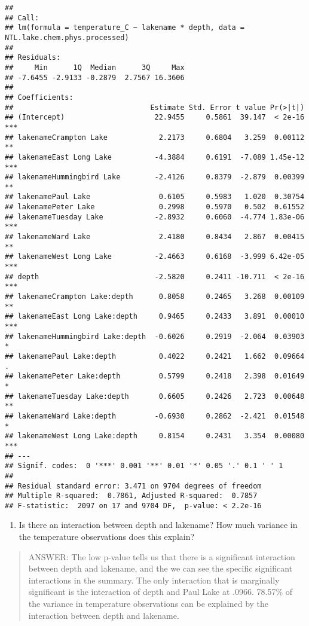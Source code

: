 \documentclass[]{article}
\providecommand{\tightlist}{%
  \setlength{\itemsep}{0pt}\setlength{\parskip}{0pt}}
\begin{document}
\begin{verbatim}
## 
## Call:
## lm(formula = temperature_C ~ lakename * depth, data = NTL.lake.chem.phys.processed)
## 
## Residuals:
##     Min      1Q  Median      3Q     Max 
## -7.6455 -2.9133 -0.2879  2.7567 16.3606 
## 
## Coefficients:
##                                Estimate Std. Error t value Pr(>|t|)    
## (Intercept)                     22.9455     0.5861  39.147  < 2e-16 ***
## lakenameCrampton Lake            2.2173     0.6804   3.259  0.00112 ** 
## lakenameEast Long Lake          -4.3884     0.6191  -7.089 1.45e-12 ***
## lakenameHummingbird Lake        -2.4126     0.8379  -2.879  0.00399 ** 
## lakenamePaul Lake                0.6105     0.5983   1.020  0.30754    
## lakenamePeter Lake               0.2998     0.5970   0.502  0.61552    
## lakenameTuesday Lake            -2.8932     0.6060  -4.774 1.83e-06 ***
## lakenameWard Lake                2.4180     0.8434   2.867  0.00415 ** 
## lakenameWest Long Lake          -2.4663     0.6168  -3.999 6.42e-05 ***
## depth                           -2.5820     0.2411 -10.711  < 2e-16 ***
## lakenameCrampton Lake:depth      0.8058     0.2465   3.268  0.00109 ** 
## lakenameEast Long Lake:depth     0.9465     0.2433   3.891  0.00010 ***
## lakenameHummingbird Lake:depth  -0.6026     0.2919  -2.064  0.03903 *  
## lakenamePaul Lake:depth          0.4022     0.2421   1.662  0.09664 .  
## lakenamePeter Lake:depth         0.5799     0.2418   2.398  0.01649 *  
## lakenameTuesday Lake:depth       0.6605     0.2426   2.723  0.00648 ** 
## lakenameWard Lake:depth         -0.6930     0.2862  -2.421  0.01548 *  
## lakenameWest Long Lake:depth     0.8154     0.2431   3.354  0.00080 ***
## ---
## Signif. codes:  0 '***' 0.001 '**' 0.01 '*' 0.05 '.' 0.1 ' ' 1
## 
## Residual standard error: 3.471 on 9704 degrees of freedom
## Multiple R-squared:  0.7861, Adjusted R-squared:  0.7857 
## F-statistic:  2097 on 17 and 9704 DF,  p-value: < 2.2e-16
\end{verbatim}

\begin{enumerate}
\def\labelenumi{\arabic{enumi}.}
\setcounter{enumi}{14}
\tightlist
\item
  Is there an interaction between depth and lakename? How much variance
  in the temperature observations does this explain?
\end{enumerate}

\begin{quote}
ANSWER: The low p-value tells us that there is a significant interaction
between depth and lakename, and the we can see the specific significant
interactions in the summary. The only interaction that is marginally
significant is the interaction of depth and Paul Lake at .0966. 78.57\%
of the variance in temperature observations can be explained by the
interaction between depth and lakename.
\end{quote}
\end{document}
